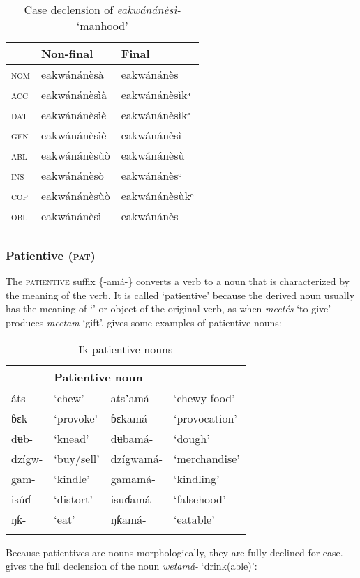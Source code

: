 \begin{table}
\caption{Case declension of \textit{eakwánánèsì-} ‘manhood’}
\label{tab:verbs:behave2}


\begin{tabularx}{.66\textwidth}{XXX}
\lsptoprule

& Non-final & Final\\
\midrule
\textsc{nom} & eakwánánèsà & eakwánánès\\
\textsc{acc} & eakwánánèsìà & eakwánánèsìkᵃ\\
\textsc{dat} & eakwánánèsìè & eakwánánèsìkᵉ\\
\textsc{gen} & eakwánánèsìè & eakwánánèsì\\
\textsc{abl} & eakwánánèsùò & eakwánánèsù\\
\textsc{ins} & eakwánánèsò & eakwánánèsᵒ\\
\textsc{cop} & eakwánánèsùò & eakwánánèsùkᵒ\\
\textsc{obl} & eakwánánèsì & eakwánánès\\
\lspbottomrule
\end{tabularx}
\end{table}

\subsubsection{Patientive (\textsc{pat})}\label{sec:8.3.3}

The \textsc{patientive} suffix \{-amá-\} converts a verb to a noun that is characterized by the meaning of the verb. It is called ‘patientive’ because the derived noun usually has the meaning of ‘’ or object of the original verb, as when \textit{meetés} ‘to give’ produces \textit{meetam} ‘gift’.  gives some examples of patientive nouns:


\begin{table}
\caption{Ik patientive nouns}
\label{tab:verbs:pat1}


\begin{tabularx}{\textwidth}{XXXX}
\lsptoprule

\multicolumn{2}{X}{Verb root} & \multicolumn{2}{X}{Patientive noun}\\
\midrule
áts- & ‘chew’ & atsʼamá- & ‘chewy food’\\
ɓɛk- & ‘provoke’ & ɓɛkamá- & ‘provocation’\\
dʉb- & ‘knead’ & dʉbamá- & ‘dough’\\
dzígw- & ‘buy/sell’ & dzígwamá- & ‘merchandise’\\
gam- & ‘kindle’ & gamamá- & ‘kindling’\\
isúɗ- & ‘distort’ & isuɗamá- & ‘falsehood’\\
ŋƙ- & ‘eat’ & ŋƙamá- & ‘eatable’\\
\lspbottomrule
\end{tabularx}
\end{table}
Because patientives are nouns morphologically, they are fully declined for case.  gives the full declension of the noun \textit{wetamá-} ‘drink(able)’:


